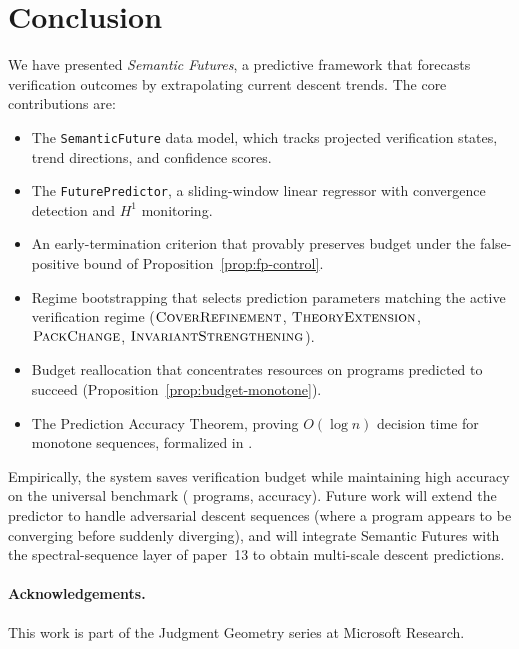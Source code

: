 \documentclass[11pt]{article}
\newcommand{\RKcov}{\textsc{CoverRefinement}}
\newcommand{\RKtheo}{\textsc{TheoryExtension}}
\newcommand{\RKpack}{\textsc{PackChange}}
\newcommand{\RKinv}{\textsc{InvariantStrengthening}}
\begin{document}
\section{Conclusion}\label{sec:conclusion}

We have presented \emph{Semantic Futures}, a predictive framework that
forecasts verification outcomes by extrapolating current descent trends.
The core contributions are:
\begin{itemize}
  \item The \texttt{SemanticFuture} data model, which tracks projected
        verification states, trend directions, and confidence scores.
  \item The \texttt{FuturePredictor}, a sliding-window linear regressor
        with convergence detection and $H^1$ monitoring.
  \item An early-termination criterion that provably preserves budget
        under the false-positive bound of Proposition~\ref{prop:fp-control}.
  \item Regime bootstrapping that selects prediction parameters matching
        the active verification regime ($\RKcov$, $\RKtheo$, $\RKpack$,
        $\RKinv$).
  \item Budget reallocation that concentrates resources on programs
        predicted to succeed (Proposition~\ref{prop:budget-monotone}).
  \item The Prediction Accuracy Theorem, proving $O(\log n)$
        decision time for monotone sequences, formalized in \LEAN{}.
\end{itemize}

Empirically, the system saves verification budget while maintaining
high accuracy on the universal benchmark (\expTotalPrograms{} programs,
\expAccuracy{} accuracy).  Future work will extend
the predictor to handle adversarial descent sequences (where a program
appears to be converging before suddenly diverging), and will integrate
Semantic Futures with the spectral-sequence layer of paper~13 to obtain
multi-scale descent predictions.

\paragraph{Acknowledgements.}
This work is part of the Judgment Geometry series at Microsoft Research.
\end{document}
